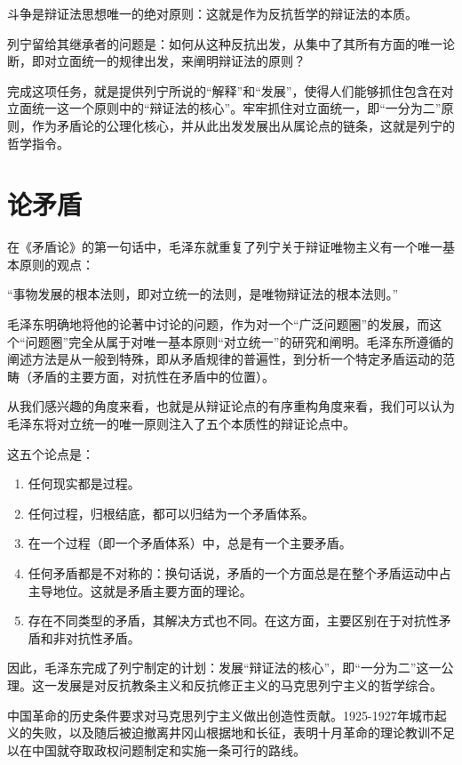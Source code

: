 \documentclass[fontset=fandol, a4paper, 12pt, twoside]{ctexart}
\renewenvironment{quote}
  {\list{}{\rightmargin=0cm \leftmargin=2em}%
   \item\relax\small\kaishu\color{black}}
  {\endlist}
\begin{document}
斗争是辩证法思想唯一的绝对原则：这就是作为反抗哲学的辩证法的本质。

列宁留给其继承者的问题是：如何从这种反抗出发，从集中了其所有方面的唯一论断，即对立面统一的规律出发，来阐明辩证法的原则？

完成这项任务，就是提供列宁所说的“解释”和“发展”，使得人们能够抓住包含在对立面统一这一个原则中的“辩证法的核心”。牢牢抓住对立面统一，即“一分为二”原则，作为矛盾论的公理化核心，并从此出发发展出从属论点的链条，这就是列宁的哲学指令。

\section{论矛盾}

在《矛盾论》的第一句话中，毛泽东就重复了列宁关于辩证唯物主义有一个唯一基本原则的观点：

\begin{quote}
“事物发展的根本法则，即对立统一的法则，是唯物辩证法的根本法则。”
\end{quote}

毛泽东明确地将他的论著中讨论的问题，作为对一个“广泛问题圈”的发展，而这个“问题圈”完全从属于对唯一基本原则“对立统一”的研究和阐明。毛泽东所遵循的阐述方法是从一般到特殊，即从矛盾规律的普遍性，到分析一个特定矛盾运动的范畴（矛盾的主要方面，对抗性在矛盾中的位置）。

从我们感兴趣的角度来看，也就是从辩证论点的有序重构角度来看，我们可以认为毛泽东将对立统一的唯一原则注入了五个本质性的辩证论点中。

这五个论点是：

\begin{enumerate}
    \item 任何现实都是过程。
    \item 任何过程，归根结底，都可以归结为一个矛盾体系。
    \item 在一个过程（即一个矛盾体系）中，总是有一个主要矛盾。
    \item 任何矛盾都是不对称的：换句话说，矛盾的一个方面总是在整个矛盾运动中占主导地位。这就是矛盾主要方面的理论。
    \item 存在不同类型的矛盾，其解决方式也不同。在这方面，主要区别在于对抗性矛盾和非对抗性矛盾。
\end{enumerate}

因此，毛泽东完成了列宁制定的计划：发展“辩证法的核心”，即“一分为二”这一公理。这一发展是对反抗教条主义和反抗修正主义的马克思列宁主义的哲学综合。

中国革命的历史条件要求对马克思列宁主义做出创造性贡献。1925-1927年城市起义的失败，以及随后被迫撤离井冈山根据地和长征，表明十月革命的理论教训不足以在中国就夺取政权问题制定和实施一条可行的路线。
\end{document}
